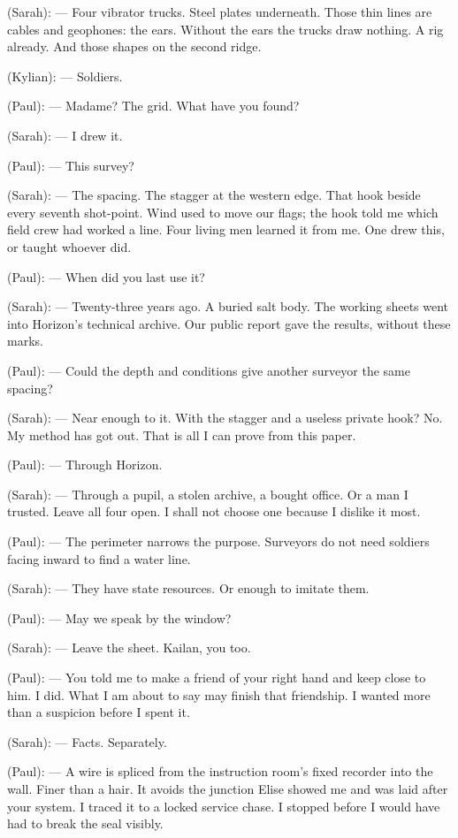 \begin{room}
(Sarah): --- Four vibrator trucks. Steel plates underneath. Those thin lines are cables and geophones: the ears. Without the ears the trucks draw nothing. A rig already. And those shapes on the second ridge.

(Kylian): --- Soldiers.

(Paul): --- Madame? The grid. What have you found?

(Sarah): --- I drew it.

\centerline{}

(Paul): --- This survey?

(Sarah): --- The spacing. The stagger at the western edge. That hook beside every seventh shot-point. Wind used to move our flags; the hook told me which field crew had worked a line. Four living men learned it from me. One drew this, or taught whoever did.

(Paul): --- When did you last use it?

(Sarah): --- Twenty-three years ago. A buried salt body. The working sheets went into Horizon's technical archive. Our public report gave the results, without these marks.

(Paul): --- Could the depth and conditions give another surveyor the same spacing?

(Sarah): --- Near enough to it. With the stagger and a useless private hook? No. My method has got out. That is all I can prove from this paper.

(Paul): --- Through Horizon.

(Sarah): --- Through a pupil, a stolen archive, a bought office. Or a man I trusted. Leave all four open. I shall not choose one because I dislike it most.

(Paul): --- The perimeter narrows the purpose. Surveyors do not need soldiers facing inward to find a water line.

(Sarah): --- They have state resources. Or enough to imitate them.

(Paul): --- May we speak by the window?

(Sarah): --- Leave the sheet. Kailan, you too.

(Paul): --- You told me to make a friend of your right hand and keep close to him. I did. What I am about to say may finish that friendship. I wanted more than a suspicion before I spent it.

(Sarah): --- Facts. Separately.

(Paul): --- A wire is spliced from the instruction room's fixed recorder into the wall. Finer than a hair. It avoids the junction Elise showed me and was laid after your system. I traced it to a locked service chase. I stopped before I would have had to break the seal visibly.


\end{room}
